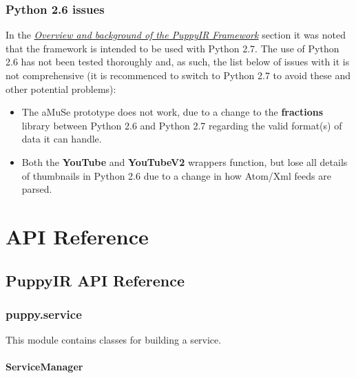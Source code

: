 \documentclass[letterpaper,10pt,english]{sphinxmanual}
\begin{document}
\subsection{Python 2.6 issues}
\label{issues:python-2-6-issues}
In the {\hyperref[overview:overview]{\emph{Overview and background of the PuppyIR Framework}}} section it was noted that the framework is intended to be used with Python 2.7. The use of Python 2.6 has not been tested thoroughly and, as such, the list below of issues with it is not comprehensive (it is recommenced to switch to Python 2.7 to avoid these and other potential problems):
\begin{itemize}
\item {} 
The aMuSe prototype does not work, due to a change to the \textbf{fractions} library between Python 2.6 and Python 2.7 regarding the valid format(s) of data it can handle.

\item {} 
Both the \textbf{YouTube} and \textbf{YouTubeV2} wrappers function, but lose all details of thumbnails in Python 2.6 due to a change in how Atom/Xml feeds are parsed.

\end{itemize}


\chapter{API Reference}
\label{index:api-reference}

\section{PuppyIR API Reference}
\label{api3.0:api}\label{api3.0::doc}\label{api3.0:puppyir-api-reference}

\subsection{puppy.service}
\label{api3.0:puppy-service}
This module contains classes for building a service.
\label{api3.0:module-puppy.service}

\subsubsection{ServiceManager}
\label{api3.0:servicemanager}
\end{document}
